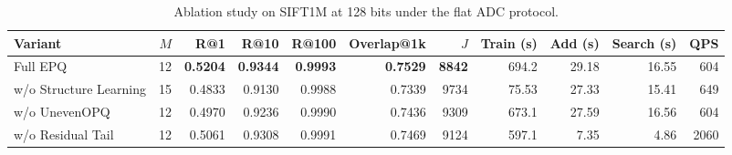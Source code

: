 \begin{table}[t]
\centering
\small
\caption{Ablation study on SIFT1M at 128 bits under the flat ADC protocol.}
\label{tab:sift128-ablation}
\begin{tabular}{lrrrrrrrrrr}
\toprule
Variant & $M$ & R@1 & R@10 & R@100 & Overlap@1k & $J$ & Train (s) & Add (s) & Search (s) & QPS \\
\midrule
Full EPQ & 12 & \textbf{0.5204} & \textbf{0.9344} & \textbf{0.9993} & \textbf{0.7529} & \textbf{8842} & 694.2 & 29.18 & 16.55 & 604 \\
w/o Structure Learning & 15 & 0.4833 & 0.9130 & 0.9988 & 0.7339 & 9734 & 75.53 & 27.33 & 15.41 & 649 \\
w/o UnevenOPQ & 12 & 0.4970 & 0.9236 & 0.9990 & 0.7436 & 9309 & 673.1 & 27.59 & 16.56 & 604 \\
w/o Residual Tail & 12 & 0.5061 & 0.9308 & 0.9991 & 0.7469 & 9124 & 597.1 & 7.35 & 4.86 & 2060 \\
\bottomrule
\end{tabular}
\end{table}

